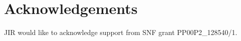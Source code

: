 \section{Acknowledgements}
JIR would like to acknowledge support from SNF grant PP00P2\_128540/1.


